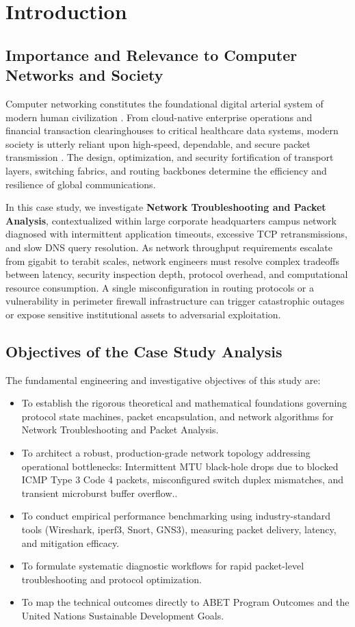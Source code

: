 \section{Introduction}

\subsection{Importance and Relevance to Computer Networks and Society}
Computer networking constitutes the foundational digital arterial system of modern human civilization \cite{kurose2021computer}. From cloud-native enterprise operations and financial transaction clearinghouses to critical healthcare data systems, modern society is utterly reliant upon high-speed, dependable, and secure packet transmission \cite{tanenbaum2021computer}. The design, optimization, and security fortification of transport layers, switching fabrics, and routing backbones determine the efficiency and resilience of global communications.

In this case study, we investigate \textbf{Network Troubleshooting and Packet Analysis}, contextualized within large corporate headquarters campus network diagnosed with intermittent application timeouts, excessive TCP retransmissions, and slow DNS query resolution. As network throughput requirements escalate from gigabit to terabit scales, network engineers must resolve complex tradeoffs between latency, security inspection depth, protocol overhead, and computational resource consumption. A single misconfiguration in routing protocols or a vulnerability in perimeter firewall infrastructure can trigger catastrophic outages or expose sensitive institutional assets to adversarial exploitation.

\subsection{Objectives of the Case Study Analysis}
The fundamental engineering and investigative objectives of this study are:
\begin{itemize}
  \item To establish the rigorous theoretical and mathematical foundations governing protocol state machines, packet encapsulation, and network algorithms for Network Troubleshooting and Packet Analysis.
  \item To architect a robust, production-grade network topology addressing operational bottlenecks: Intermittent MTU black-hole drops due to blocked ICMP Type 3 Code 4 packets, misconfigured switch duplex mismatches, and transient microburst buffer overflow..
  \item To conduct empirical performance benchmarking using industry-standard tools (Wireshark, iperf3, Snort, GNS3), measuring packet delivery, latency, and mitigation efficacy.
  \item To formulate systematic diagnostic workflows for rapid packet-level troubleshooting and protocol optimization.
  \item To map the technical outcomes directly to ABET Program Outcomes and the United Nations Sustainable Development Goals.
\end{itemize}
